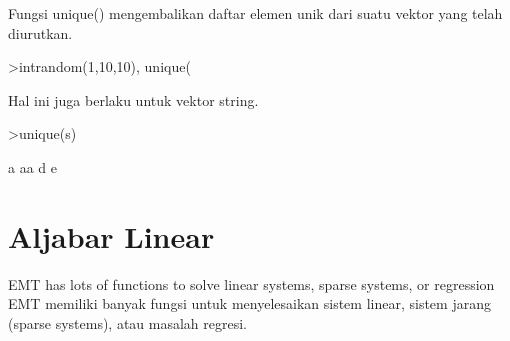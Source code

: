 \documentclass{article}
\newenvironment{eulernotebook}{\par}{\par}
\newcommand{\eulerheading}[1]{\section{#1}}
\newenvironment{eulercomment}{\par\medskip}{\par\medskip}
\begin{document}
\begin{eulernotebook}
\begin{eulercomment}
\begin{eulercomment}
\begin{eulercomment}
\begin{eulercomment}
\begin{eulercomment}
\begin{eulercomment}
\begin{eulercomment}
Fungsi unique() mengembalikan daftar elemen unik dari suatu vektor
yang telah diurutkan.
\end{eulercomment}
\begin{eulerprompt}
>intrandom(1,10,10), unique(%
\end{eulerprompt}
\begin{euleroutput}
  [4,  4,  9,  2,  6,  5,  10,  6,  5,  1]
  [1,  2,  4,  5,  6,  9,  10]
\end{euleroutput}
\begin{eulercomment}
Hal ini juga berlaku untuk vektor string.
\end{eulercomment}
\begin{eulerprompt}
>unique(s)
\end{eulerprompt}
\begin{euleroutput}
  a
  aa
  d
  e
\end{euleroutput}
\eulerheading{Aljabar Linear}
\begin{eulercomment}
EMT has lots of functions to solve linear systems, sparse systems, or
regression EMT memiliki banyak fungsi untuk menyelesaikan sistem
linear, sistem jarang (sparse systems), atau masalah regresi.


\end{eulercomment}
\end{eulercomment}
\end{eulercomment}
\end{eulercomment}
\end{eulercomment}
\end{eulercomment}
\end{eulercomment}
\end{eulernotebook}
\end{document}
